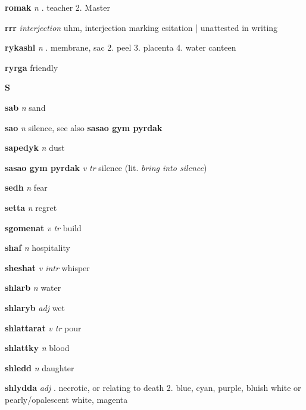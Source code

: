 \textbf{romak}   \emph{n} . teacher 2. Master 

\textbf{rrr}   \emph{interjection} \textperiodcentered uhm, interjection marking esitation | unattested in writing

\textbf{rykashl}   \emph{n} . membrane, sac 2. peel 3. placenta 4. water canteen 

\textbf{ryrga}    \textperiodcentered friendly

\begin{center} \Huge \bfseries S \end{center}\textbf{sab}   \emph{n} \textperiodcentered sand

\textbf{sao}   \emph{n} \textperiodcentered silence, see also \textbf{sasao gym pyrdak}

\textbf{sapedyk}   \emph{n} \textperiodcentered dust

\textbf{sasao gym pyrdak}   \emph{v tr} \textperiodcentered silence (lit. \emph{bring into silence})

\textbf{sedh}   \emph{n} \textperiodcentered fear

\textbf{setta}   \emph{n} \textperiodcentered regret

\textbf{sgomenat}   \emph{v tr} \textperiodcentered build

\textbf{shaf}   \emph{n} \textperiodcentered hospitality

\textbf{sheshat}   \emph{v intr} \textperiodcentered whisper

\textbf{shlarb}   \emph{n} \textperiodcentered water

\textbf{shlaryb}   \emph{adj} \textperiodcentered wet

\textbf{shlattarat}   \emph{v tr} \textperiodcentered pour

\textbf{shlattky}   \emph{n} \textperiodcentered blood

\textbf{shledd}   \emph{n} \textperiodcentered daughter

\textbf{shlydda}   \emph{adj} . necrotic, or relating to death 2. blue, cyan, purple, bluish white or pearly/opalescent white, magenta 

